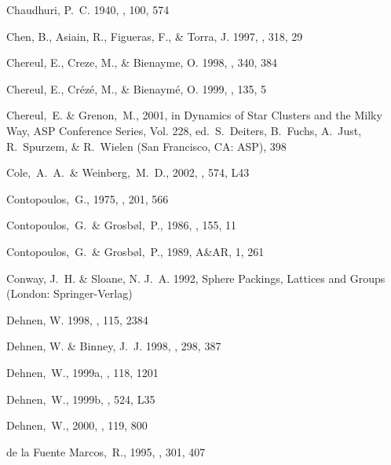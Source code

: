 \begin{thebibliography}{99}
{Chaudhuri}, P.~C. 1940, \mnras, 100, 574

{Chen}, B., {Asiain}, R., {Figueras}, F., \& {Torra}, J. 1997, \aap, 318, 29

{Chereul}, E., {Creze}, M., \& {Bienayme}, O. 1998, \aap, 340, 384

{Chereul}, E., {Cr{\'e}z{\'e}}, M., \& {Bienaym{\'e}}, O. 1999, \aaps, 135, 5

  Chereul,~E. \& Grenon,~M., 2001, in Dynamics of Star Clusters and the
  Milky Way, ASP Conference Series, Vol. 228, ed.~S.~Deiters, B.~Fuchs,
  A.~Just, R.~Spurzem, \& R.~Wielen (San Francisco, CA: ASP), 398

  Cole,~A.~A.~\& Weinberg,~M.~D., 2002,
  \apjl, 574, L43

  Contopoulos,~G., 1975,
  \apj, 201, 566

  Contopoulos,~G.~\& Grosb\o l,~P., 1986,
  \aap, 155, 11

  Contopoulos,~G.~\& Grosb\o l,~P., 1989,
  A\&AR, 1, 261

{Conway}, J.~H. \& {Sloane}, N. J.~A. 1992, {Sphere Packings, Lattices and
  Groups} (London: {Springer-Verlag})

{Dehnen}, W. 1998, \aj, 115, 2384

{Dehnen}, W. \& {Binney}, J.~J. 1998, \mnras, 298, 387

  Dehnen,~W., 1999a, \aj, 118, 1201

  Dehnen,~W., 1999b, \apj, 524, L35

  Dehnen,~W., 2000, \aj, 119, 800

  de la Fuente Marcos,~R., 1995,
  \aap, 301, 407


\end{thebibliography}
